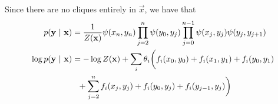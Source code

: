 Since there are no cliques entirely in $\vec{x}$, we have that
\begin{align*}
    p(\mathbf{y} ~\vert~ \mathbf{x}) &= \frac{1}{Z(\mathbf{x})} \psi(x_n, y_n)\prod_{j=2}^n\psi(y_0, y_j) \prod_{j=0}^{n-1} \psi(x_j, y_j)\psi(y_j, y_{j+1})\\
    \log p(\mathbf{y}~\vert~ \mathbf{x}) 
        &= -\log Z(\mathbf{x}) + \sum_i \theta_i \biggr(f_i(x_0, y_0) + f_i(x_1, y_1) + f_i(y_0, y_1) \\ &~~+ \sum_{j=2}^n f_i(x_j, y_j) + f_i(y_0, y_j) + f_i(y_{j-1},y_j) \biggr)
\end{align*}